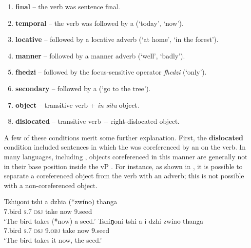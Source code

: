 \documentclass[output=paper 
,modfonts
,nonflat]{langsci/langscibook}
\begin{document}
\begin{enumerate}
\item \textbf{final} -- the verb was sentence final.
\item \textbf{temporal} -- the verb was followed by a  (`today',
	`now').
\item \textbf{locative} -- followed by a locative adverb (`at home', `in the
forest').
\item \textbf{manner} -- followed by a manner adverb (`well', `badly').
\item \textbf{fhedzi} -- followed by the focus-sensitive operator \textit{fhedzi}
(`only').
\item \textbf{secondary} -- followed by a  (`go to the
tree').
\item \textbf{object} -- transitive verb + \textit{in situ} object.
\item \textbf{dislocated} -- transitive verb + right-dislocated object.
\end{enumerate}

A few of these conditions merit some further explanation. First, the
\textbf{dislocated} condition included sentences in which the  was
coreferenced by an  on the verb. In many  languages,
including , objects coreferenced in this manner are generally not
in their base position inside the vP \citep{Buell2005}. For instance, as shown in
, it is possible to separate a coreferenced object from the verb with an
adverb; this is not possible with a non-coreferenced object.


\ea \label{ex:kusmer:insitu-demonstration}
\ea \gll Tshiṋoni tshi a dzhia (*zwíno) thanga\\
		  7.bird  \textsc{s.7} \textsc{dsj} take now 9.seed\\
		\glt  `The bird takes (*now) a seed.'
		\z
	\ea \gll Tshiṋoni tshi a í dzhi zwíno thanga\\
		  7.bird  \textsc{s.7} \textsc{dsj} \textsc{9.obj} take now 9.seed\\
	 \glt `The bird takes it now, the seed.'
	 \z
 \z
\end{document}
